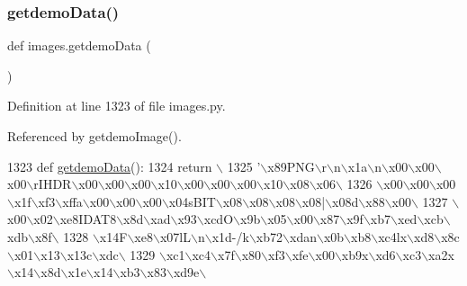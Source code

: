 \subsubsection{\texorpdfstring{getdemo\+Data()}{getdemoData()}}
{\footnotesize\ttfamily def images.\+getdemo\+Data (\begin{DoxyParamCaption}{ }\end{DoxyParamCaption})}



Definition at line 1323 of file images.\+py.



Referenced by getdemo\+Image().


\begin{DoxyCode}
1323 \textcolor{keyword}{def }\hyperlink{namespaceimages_aefe2e85aaaee18eb0ec08f7a35451037}{getdemoData}():
1324     \textcolor{keywordflow}{return} \(\backslash\)
1325 \textcolor{stringliteral}{'\(\backslash\)x89PNG\(\backslash\)r\(\backslash\)n\(\backslash\)x1a\(\backslash\)n\(\backslash\)x00\(\backslash\)x00\(\backslash\)x00\(\backslash\)rIHDR\(\backslash\)x00\(\backslash\)x00\(\backslash\)x00\(\backslash\)x10\(\backslash\)x00\(\backslash\)x00\(\backslash\)x00\(\backslash\)x10\(\backslash\)x08\(\backslash\)x06\(\backslash\)}
1326 \textcolor{stringliteral}{\(\backslash\)x00\(\backslash\)x00\(\backslash\)x00\(\backslash\)x1f\(\backslash\)xf3\(\backslash\)xffa\(\backslash\)x00\(\backslash\)x00\(\backslash\)x00\(\backslash\)x04sBIT\(\backslash\)x08\(\backslash\)x08\(\backslash\)x08\(\backslash\)x08|\(\backslash\)x08d\(\backslash\)x88\(\backslash\)x00\(\backslash\)}
1327 \textcolor{stringliteral}{\(\backslash\)x00\(\backslash\)x02\(\backslash\)xe8IDAT8\(\backslash\)x8d\(\backslash\)xad\(\backslash\)x93\(\backslash\)xcdO\(\backslash\)x9b\(\backslash\)x05\(\backslash\)x00\(\backslash\)x87\(\backslash\)x9f\(\backslash\)xb7\(\backslash\)xed\(\backslash\)xcb\(\backslash\)xdb\(\backslash\)x8f\(\backslash\)}
1328 \textcolor{stringliteral}{\(\backslash\)x14F\(\backslash\)xe8\(\backslash\)x07lL\(\backslash\)n\(\backslash\)x1d-/k\(\backslash\)xb72\(\backslash\)xdan\(\backslash\)x0b\(\backslash\)xb8\(\backslash\)xc4lx\(\backslash\)xd8\(\backslash\)x8c\(\backslash\)x01\(\backslash\)x13\(\backslash\)x13c\(\backslash\)xdc\(\backslash\)}
1329 \textcolor{stringliteral}{\(\backslash\)xc1\(\backslash\)xc4\(\backslash\)x7f\(\backslash\)x80\(\backslash\)xf3\(\backslash\)xfe\(\backslash\)x00\(\backslash\)xb9x\(\backslash\)xd6\(\backslash\)xc3\(\backslash\)xa2x\(\backslash\)x14\(\backslash\)x8d\(\backslash\)x1e\(\backslash\)x14\(\backslash\)xb3\(\backslash\)x83\(\backslash\)xd9e\(\backslash\)}

\end{DoxyCode}
